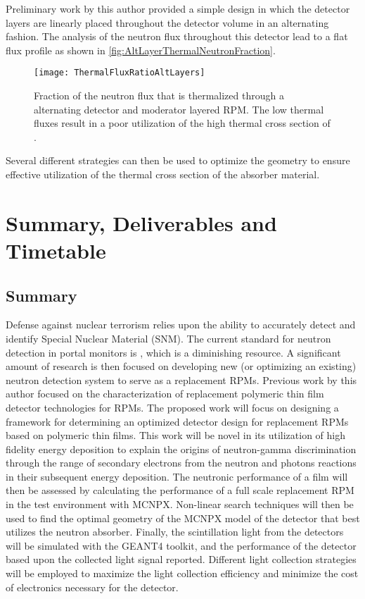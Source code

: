 Preliminary work by this author provided a simple design in which the detector layers are linearly placed throughout the detector volume in an alternating fashion.
The analysis of the neutron flux throughout this detector lead to a flat flux profile as shown in \autoref{fig:AltLayerThermalNeutronFraction}.
\begin{figure}
  \texttt{[image: ThermalFluxRatioAltLayers]}
	\caption{Fraction of the neutron flux that is thermalized through a alternating detector and moderator layered RPM.  The low thermal fluxes result in a poor utilization of the high thermal cross section of .}
	\label{fig:AltLayerThermalNeutronFraction}
\end{figure}
Several different strategies can then be used to optimize the geometry to ensure effective utilization of the thermal cross section of the absorber material.
\chapter{Summary, Deliverables and Timetable}
\label{ch:SummaryDeliverables}
\section{Summary}
Defense against nuclear terrorism relies upon the ability to accurately detect and identify Special Nuclear Material (SNM).
The current standard for neutron detection in portal monitors is , which is a diminishing resource. 
A significant amount of research is then focused on developing new (or optimizing an existing) neutron detection system to serve as a replacement RPMs.
Previous work by this author focused on the characterization of replacement polymeric thin film detector technologies for RPMs.  
The proposed work will focus on designing a framework for determining an optimized detector design for replacement RPMs based on polymeric thin films.
This work will be novel in its utilization of high fidelity energy deposition to explain the origins of neutron-gamma discrimination through the range of secondary electrons from the neutron and photons reactions in their subsequent energy deposition.
The neutronic performance of a film will then be assessed by calculating the performance of a full scale replacement RPM in the test environment with MCNPX.
Non-linear search techniques will then be used to find the optimal geometry of the MCNPX model of the detector that best utilizes the neutron absorber.
Finally, the scintillation light from the detectors will be simulated with the GEANT4 toolkit, and the performance of the detector based upon the collected light signal reported.
Different light collection strategies will be employed to maximize the light collection efficiency and minimize the cost of electronics necessary for the detector.


